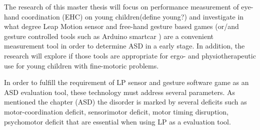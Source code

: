 The research of this master thesis will focus on performance measurement of eye-hand coordination (EHC) on young children(define young?) and investigate in what degree Leap Motion sensor and free-hand gesture based games (or/and gesture controlled tools such as Arduino smartcar ) are a convenient measurement tool in order to determine ASD in a early stage. In addition, the research will explore if those tools are appropriate for ergo- and physiotherapeutic use for young children with fine-motoric problems.

In order to fulfill the requirement of  LP sensor and gesture software game as an ASD evaluation tool, these technology must address several parameters. As mentioned the chapter (ASD) the disorder is marked by several deficits such as motor-coordination deficit, sensorimotor deficit, motor timing disruption, psychomotor deficit that are essential when using LP as a evaluation tool. 

